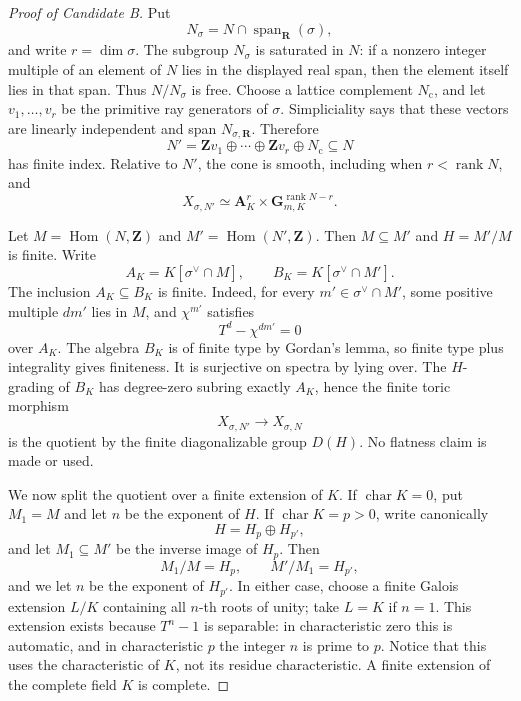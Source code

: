 \begin{proof}[Proof of Candidate B]
Put
\[
              N_\sigma=N\cap\operatorname{span}_{\mathbf R}(\sigma),
\]
and write \(r=\dim\sigma\).  The subgroup \(N_\sigma\) is saturated in
\(N\): if a nonzero integer multiple of an element of \(N\) lies in the
displayed real span, then the element itself lies in that span.  Thus
\(N/N_\sigma\) is free.  Choose a lattice complement \(N_{\mathrm c}\),
and let \(v_1,\ldots,v_r\) be the primitive ray generators of
\(\sigma\).  Simpliciality says that these vectors are linearly independent
and span \(N_{\sigma,\mathbf R}\).  Therefore
\[
        N'=\mathbf Z v_1\oplus\cdots\oplus\mathbf Z v_r
                      \oplus N_{\mathrm c}\subseteq N
\]
has finite index.  Relative to \(N'\), the cone is smooth, including when
\(r<\operatorname{rank}N\), and
\begin{equation}
 \label{eq:candidate-b-smooth-cover}
       X_{\sigma,N'}\simeq
       \mathbf A^r_K\times\mathbf G_{m,K}^{\operatorname{rank}N-r}.
\end{equation}

Let \(M=\operatorname{Hom}(N,\mathbf Z)\) and
\(M'=\operatorname{Hom}(N',\mathbf Z)\).  Then \(M\subseteq M'\) and
\(H=M'/M\) is finite.  Write
\[
 A_K=K[\sigma^\vee\cap M],
 \qquad B_K=K[\sigma^\vee\cap M'].
\]
The inclusion \(A_K\subseteq B_K\) is finite.  Indeed, for every
\(m'\in\sigma^\vee\cap M'\), some positive multiple \(d m'\) lies in
\(M\), and \(\chi^{m'}\) satisfies
\[
                         T^d-\chi^{d m'}=0
\]
over \(A_K\).  The algebra \(B_K\) is of finite type by Gordan's lemma, so
finite type plus integrality gives finiteness.  It is surjective on spectra
by lying over.  The \(H\)-grading of \(B_K\) has degree-zero subring
exactly \(A_K\), hence the finite toric morphism
\begin{equation}
 \label{eq:candidate-b-full-cover}
             X_{\sigma,N'}\longrightarrow X_{\sigma,N}
\end{equation}
is the quotient by the finite diagonalizable group \(D(H)\).  No flatness
claim is made or used.

We now split the quotient over a finite extension of \(K\).  If
\(\operatorname{char}K=0\), put \(M_1=M\) and let \(n\) be the exponent
of \(H\).  If \(\operatorname{char}K=p>0\), write canonically
\[
                              H=H_p\oplus H_{p'},
\]
and let \(M_1\subseteq M'\) be the inverse image of \(H_p\).  Then
\[
                       M_1/M=H_p,
             \qquad M'/M_1=H_{p'},
\]
and we let \(n\) be the exponent of \(H_{p'}\).  In either case, choose a
finite Galois extension \(L/K\) containing all \(n\)-th roots of unity;
take \(L=K\) if \(n=1\).  This extension exists because \(T^n-1\) is
separable: in characteristic zero this is automatic, and in characteristic
\(p\) the integer \(n\) is prime to \(p\).  Notice that this uses the
characteristic of \(K\), not its residue characteristic.  A finite extension
of the complete field \(K\) is complete.


\end{proof}
